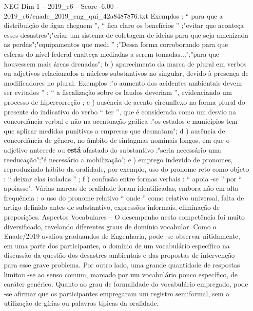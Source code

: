 \begin{textsample}{NEG Dim 1 – 2019\_c6 – Score -6.00 – 2019\_c6/enade\_2019\_eng\_qui\_42a8487876.txt}
Exemplos : “ para que a distribuição de água cheguem ”, “ fica claro os benefícios ” ;"evitar que aconteça esses desastres";"criar um sistema de coletagem de ideias para que seja amenizada as perdas";"equipamentos que medi ” ;"Dessa forma corroborando para que esferas do nível federal enalteça mediadas a serem tomadas...";"para que houvessem mais áreas drenadas"; b ) aparecimento da marca de plural em verbos ou adjetivos relacionados a núcleos substantivos no singular, devido à presença de modificadores no plural.
Exemplos :"o aumento dos acidentes ambientais devem ser evitados ” ; “ a fiscalização sobre os laudos deveriam ”, evidenciando um processo de hipercorreção ; c ) ausência de acento circunflexo na forma plural do presente do indicativo do verbo “ ter ”, que é considerada como um desvio na concordância verbal e não na acentuação gráfica :"os estados e municípios tem que aplicar medidas punitivas a empresas que desmatam"; d ) ausência de concordância de gênero, no âmbito de sintagmas nominais longos, em que o adjetivo antecede ou \textbf{está} afastado do substantivo :"seria necessário uma reeducação";"é necessário a mobilização"; e ) emprego indevido de pronomes, reproduzindo hábito da oralidade, por exemplo, uso do pronome reto como objeto : “ deixar elas isoladas ” ; f ) confusão entre formas verbais : “ apoia -se ” por “ apoiasse".
Várias marcas de oralidade foram identificadas, embora não em alta frequência : o uso do pronome relativo “ onde ” como relativo universal, falta de artigo definido antes de substantivo, expressões informais, eliminação de preposições.
Aspectos Vocabulares – O desempenho nesta competência foi muito diversificado, revelando diferentes graus de domínio vocabular.
Como o Enade/2019 avaliou graduandos de Engenharia, pode -se observar nitidamente, em uma parte dos participantes, o domínio de um vocabulário específico na discussão da questão dos desastres ambientais e das propostas de intervenção para esse grave problema.
Por outro lado, uma grande quantidade de respostas limitou -se ao senso comum, marcado por um vocabulário pouco específico, de caráter genérico.
Quanto ao grau de formalidade do vocabulário empregado, pode -se afirmar que os participantes empregaram um registro semiformal, sem a utilização de gírias ou palavras típicas da oralidade.

\end{textsample}
